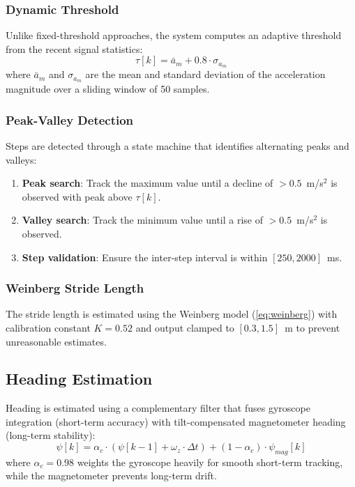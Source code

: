 \documentclass[journal,twocolumn]{IEEEtran}
\begin{document}
\subsubsection{Dynamic Threshold}
Unlike fixed-threshold approaches, the system computes an adaptive threshold from the recent signal statistics:
\begin{equation}
    \tau[k] = \bar{a}_m + 0.8 \cdot \sigma_{a_m}
    \label{eq:threshold}
\end{equation}
where $\bar{a}_m$ and $\sigma_{a_m}$ are the mean and standard deviation of the acceleration magnitude over a sliding window of 50 samples.

\subsubsection{Peak-Valley Detection}
Steps are detected through a state machine that identifies alternating peaks and valleys:
\begin{enumerate}
    \item \textbf{Peak search}: Track the maximum value until a decline of $>0.5$~m/s$^2$ is observed with peak above $\tau[k]$.
    \item \textbf{Valley search}: Track the minimum value until a rise of $>0.5$~m/s$^2$ is observed.
    \item \textbf{Step validation}: Ensure the inter-step interval is within $[250, 2000]$~ms.
\end{enumerate}

\subsubsection{Weinberg Stride Length}
The stride length is estimated using the Weinberg model (\ref{eq:weinberg}) with calibration constant $K = 0.52$ and output clamped to $[0.3, 1.5]$~m to prevent unreasonable estimates.

\subsection{Heading Estimation}

Heading is estimated using a complementary filter that fuses gyroscope integration (short-term accuracy) with tilt-compensated magnetometer heading (long-term stability):
\begin{equation}
    \psi[k] = \alpha_c \cdot (\psi[k-1] + \omega_z \cdot \Delta t) + (1 - \alpha_c) \cdot \psi_{mag}[k]
    \label{eq:complementary}
\end{equation}
where $\alpha_c = 0.98$ weights the gyroscope heavily for smooth short-term tracking, while the magnetometer prevents long-term drift.
\end{document}

